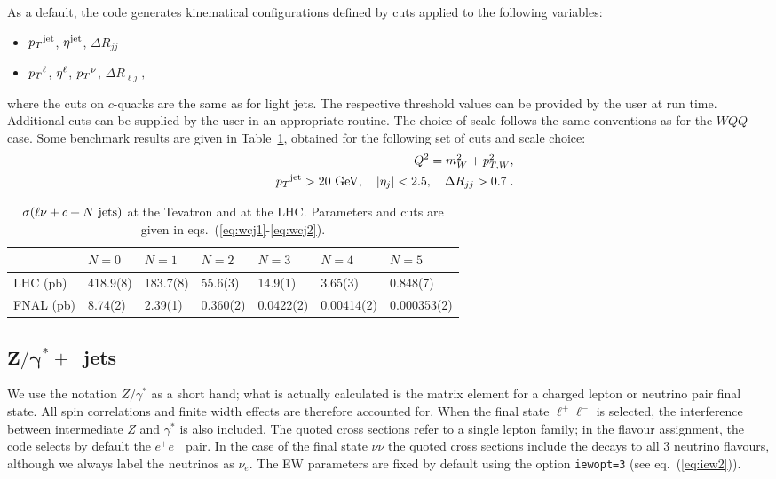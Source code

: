 \documentclass[paper]{JHEP3}
\newcommand{\gev}{\mbox{GeV}}
\newcommand{\ccaption}[2]{
    \begin{center}
    \parbox{0.85\textwidth}{
      \caption[#1]{\small{{#2}}}
      }
    \end{center}
    }
\def    \ba             {\begin{eqnarray}}
\def    \ea             {\end{eqnarray}}
\def    \gev            {\mbox{$\mathrm{GeV}$}}
\def    \Qbar   {\overline{Q}}
\def    \mWsq             {\mbox{$m_W^2$} }
\def    \pt             {\mbox{$p_T$}}
\def    \ptWsq           {\mbox{$p^2_{T,W}$}}
\begin{document}
As a default, the code generates kinematical configurations defined by
cuts applied to the following variables:
\begin{itemize}
\item $\pt^{\rm jet}$, $\eta^{\rm jet}$, $\Delta R_{jj}$
\item $\pt^{\rm \ell}$, $\eta^{\rm \ell}$, $\pt^{\rm \nu}$, $\Delta
  R_{\ell j} \; ,$ 
\end{itemize}
where the cuts on $c$-quarks are the same as for light jets. 
The respective threshold values can be provided by the user at run
time. Additional cuts can be supplied by the user in an appropriate
routine. 
The choice of scale follows the same conventions as for the $WQ\Qbar$
case.
Some benchmark results are given in Table~\ref{tab:wcjxs}, obtained
for the following set of cuts and scale choice:
\ba \label{eq:wcj1}
&& Q^2 = \mWsq + \ptWsq,
\\
        && \pt^{\rm jet}>20~\gev, \quad \vert \eta_j\vert < 2.5, \quad \Delta
        R_{jj} >0.7 \; .
\label{eq:wcj2}
\ea

{\renewcommand{\arraystretch}{1.2}
\begin{table}
\begin{center}
\begin{tabular}{||l|l|l|l|l|l|l||}\hline
 & $N = 0$ & $N = 1$ & $N = 2$  & $N = 3$ & $N = 4$ & $N = 5$            \\ \hline
LHC (pb)    & 418.9(8) & 183.7(8) & 55.6(3) & 14.9(1)& 3.65(3)& 0.848(7) \\ \hline
FNAL (pb)   & 8.74(2)  & 2.39(1)&  0.360(2)& 0.0422(2)& 0.00414(2)& 0.000353(2)\\ \hline
\end{tabular}           
\ccaption{}{\label{tab:wcjxs} $\sigma(\ell \nu + c +N~{\rm jets})$
at the Tevatron and 
at the LHC. Parameters and cuts are given
in eqs.~(\ref{eq:wcj1}-\ref{eq:wcj2}).}
\end{center}
\end{table}}

\subsection{$\mathbf{Z/\gamma^{*}+}$~jets}
\label{sec:zjets}
We use the notation $Z/\gamma^{*}$ as a short hand; what is actually
calculated is the matrix element for a charged lepton or neutrino pair
final state. All spin correlations and finite width effects are
therefore accounted for. When the final state $\ell^+ \ell^-$ is
selected, the interference between intermediate $Z$ and $\gamma^{*}$ is
also included. The quoted cross sections refer to a single lepton
family; in the flavour assignment, the code selects by default the
$e^+ e^-$ pair. In the case of the final state $\nu \bar\nu$ the
quoted cross sections include the decays to all 3 neutrino flavours,
although we always label the neutrinos as $\nu_e$.
The EW parameters are fixed by default using the option {\tt iewopt=3}
(see eq.~(\ref{eq:iew2})).
\end{document}
